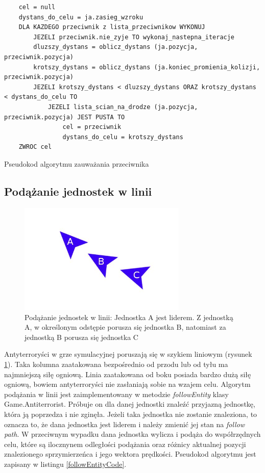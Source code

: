 \begin{table}
\begin{center}
\begin{lstlisting}
	cel = null
	dystans_do_celu = ja.zasieg_wzroku
	DLA KAZDEGO przeciwnik z lista_przeciwnikow WYKONUJ
		JEZELI przeciwnik.nie_zyje TO wykonaj_nastepna_iteracje
		dluzszy_dystans = oblicz_dystans (ja.pozycja, przeciwnik.pozycja)
		krotszy_dystans = oblicz_dystans (ja.koniec_promienia_kolizji, przeciwnik.pozycja)
		JEZELI krotszy_dystans < dluzszy_dystans ORAZ krotszy_dystans < dystans_do_celu TO
			JEZELI lista_scian_na_drodze (ja.pozycja, przeciwnik.pozycja) JEST PUSTA TO
				cel = przeciwnik
				dystans_do_celu = krotszy_dystans		
	ZWROC cel	
\end{lstlisting}
\caption {Pseudokod algorytmu zauważania przeciwnika}
\label{detectionCode}
\end{center}
\end{table}

\subsection{Podążanie jednostek w linii}

\begin{figure}
\begin{center}
	\includegraphics[width=80mm,height=53mm]{images/followEntity}
	\caption[Podążanie jednostek w linii]{Podążanie jednostek w linii: Jednostka A jest liderem. Z jednostką A, w określonym odstępie porusza się jednostka B, natomiast za jednostką B porusza się jednostka C\label{followEntityImage}}
\end{center}
\end{figure}

Antyterroryści w grze symulacyjnej poruszają się w szykiem liniowym (rysunek \ref{followEntityImage}). Taka kolumna zaatakowana bezpośrednio od przodu lub od tyłu ma najmniejszą siłę ogniową. Linia zaatakowana od boku posiada bardzo dużą siłę ogniową, bowiem antyterroryści nie zasłaniają sobie na wzajem celu. Algorytm podążania w linii jest zaimplementowany w metodzie \emph{followEntity} klasy Game.Antiterrorist. Próbuje on dla danej jednostki znaleźć przyjazną jednostkę, która ją poprzedza i nie zginęła. Jeżeli taka jednostka nie zostanie znaleziona, to oznacza to, że dana jednostka jest liderem i należy zmienić jej stan na \emph{follow path}. W przeciwnym wypadku dana jednostka wylicza i podąża do współrzędnych celu, które są ilocznynem odległości podążania oraz różnicy aktualnej pozycji znalezionego sprzymierzeńca i jego wektora prędkości. Pseudokod algorytmu jest zapisany w listingu \ref{followEntityCode}.

